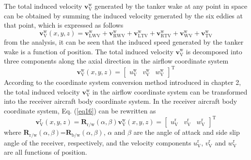 The total induced velocity $\mathbf{v}^\mathrm{w}_\mathrm{V}$ generated by the tanker wake at any point in space can be obtained by summing the induced velocity generated by the six eddies at that point, which is expressed as follows
\begin{equation}\label{eq16}
\mathbf{v}_{\mathrm{V}}^{\mathrm{w}}(x, y, z)=\mathbf{v}_{\mathrm{LWV}}^{\mathrm{w}}+\mathbf{v}_{\mathrm{RWV}}^{\mathrm{w}}+\mathbf{v}_{\mathrm{LTV}}^{\mathrm{w}}+\mathbf{v}_{\mathrm{RTV}}^{\mathrm{w}}+\mathbf{v}_{\mathrm{WV}}^{\mathrm{w}}+\mathbf{v}_{\mathrm{TV}}^{\mathrm{w}}
\end{equation}
from the analysis, it can be seen that the induced speed generated by the tanker wake is a function of position. The total induced velocity $\mathbf{v}^\mathrm{w}_\mathrm{V}$ is decomposed into three components along the axial direction in the airflow coordinate system
\begin{equation}\label{eq17}
\mathbf{v}_{\mathrm{V}}^{\mathrm{w}}(x, y, z)=\left[\begin{array}{lll}
u_{\mathrm{V}}^{\mathrm{w}} & v_{\mathrm{V}}^{\mathrm{w}} & w_{\mathrm{V}}^{\mathrm{w}}
\end{array}\right]^{\mathrm{T}}
\end{equation}
According to the coordinate system conversion method introduced in chapter 2, the total induced velocity $\mathbf{v}^\mathrm{w}_\mathrm{V}$ in the airflow coordinate system can be transformed into the receiver aircraft body coordinate system. In the receiver aircraft body coordinate system, Eq. (\ref{eq16}) can be rewritten as 
\begin{equation}\label{eq18}
\mathbf{v}_{\mathrm{V}}^{\mathrm{r}}(x, y, z)=\mathbf{R}_{\mathrm{r} / \mathrm{w}}(\alpha, \beta) \mathbf{v}_{\mathrm{V}}^{\mathrm{w}}(x, y, z)=\left[\begin{array}{lll}
u_{\mathrm{V}}^{\mathrm{r}} & v_{\mathrm{V}}^{\mathrm{r}} & w_{\mathrm{V}}^{\mathrm{r}}
\end{array}\right]^{\mathrm{T}}
\end{equation}
where $\mathbf{R}_\mathrm{r / w}(\alpha, \beta)$=$\mathbf{R}_\mathrm{b / w}(\alpha,\beta)$, $\alpha$ and $\beta$ are the angle of attack and side slip angle of the receiver, respectively, and the velocity components $u^\mathrm{r}_\mathrm{V}$, $v^\mathrm{r}_\mathrm{V}$ and $w^\mathrm{r}_\mathrm{V}$ are all functions of position.

